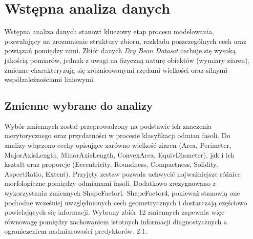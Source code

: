 \documentclass{report}
\begin{document}
\section{Wstępna analiza danych}

Wstępna analiza danych stanowi kluczowy etap procesu modelowania, pozwalający na zrozumienie struktury zbioru, rozkładu poszczególnych cech oraz powiązań pomiędzy nimi. Zbiór danych \textit{Dry Bean Dataset} cechuje się wysoką jakością pomiarów, jednak z uwagi na fizyczną naturę obiektów (wymiary ziaren), zmienne charakteryzują się zróżnicowanymi rzędami wielkości oraz silnymi współzależnościami liniowymi.

\subsection{Zmienne wybrane do analizy}

Wybór zmiennych został przeprowadzony na podstawie ich znaczenia merytorycznego oraz przydatności w procesie klasyfikacji odmian fasoli. Do analizy włączono cechy opisujące zarówno wielkość ziaren (Area, Perimeter, MajorAxisLength, MinorAxisLength, ConvexArea, EquivDiameter), jak i ich kształt oraz proporcje (Eccentricity, Roundness, Compactness, Solidity, AspectRatio, Extent). Przyjęty zestaw pozwala uchwycić najważniejsze różnice morfologiczne pomiędzy odmianami fasoli. Dodatkowo zrezygnowano z wykorzystania zmiennych ShapeFactor1–ShapeFactor4, ponieważ stanowią one pochodne wcześniej uwzględnionych cech geometrycznych i dostarczają częściowo powielających się informacji. Wybrany zbiór 12 zmiennych zapewnia więc równowagę pomiędzy zachowaniem istotnych informacji diagnostycznych a ograniczeniem nadmiarowości predyktorów. 2.1.
\end{document}
